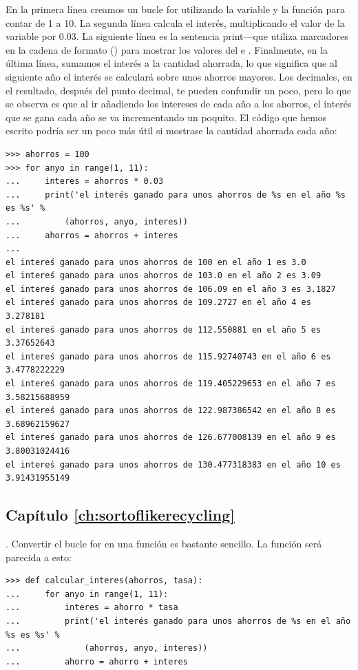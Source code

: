 En la primera línea creamos un bucle for utilizando la variable  y la función  para contar de 1 a 10.   La segunda línea calcula el interés, multiplicando el valor de la variable  por 0.03.  La siguiente línea es la sentencia print---que utiliza marcadores en la cadena de formato () para mostrar los valores del  e .  Finalmente, en la última línea, sumamos el interés a la cantidad ahorrada, lo que significa que al siguiente año el interés se calculará sobre unos ahorros mayores.
Los decimales, en el resultado, después del punto decimal, te pueden confundir un poco, pero lo que se observa es que al ir añadiendo los intereses de cada año a los ahorros, el interés que se gana cada año se va incrementando un poquito.
El código que hemos escrito podría ser un poco más útil si mostrase la cantidad ahorrada cada año:

\begin{listing}
\begin{verbatim}
>>> ahorros = 100
>>> for anyo in range(1, 11):
...     interes = ahorros * 0.03
...     print('el interés ganado para unos ahorros de %s en el año %s es %s' % 
...         (ahorros, anyo, interes))
...     ahorros = ahorros + interes
... 
el intereś ganado para unos ahorros de 100 en el año 1 es 3.0
el intereś ganado para unos ahorros de 103.0 en el año 2 es 3.09
el intereś ganado para unos ahorros de 106.09 en el año 3 es 3.1827
el intereś ganado para unos ahorros de 109.2727 en el año 4 es 3.278181
el intereś ganado para unos ahorros de 112.550881 en el año 5 es 3.37652643
el intereś ganado para unos ahorros de 115.92740743 en el año 6 es 3.4778222229
el intereś ganado para unos ahorros de 119.405229653 en el año 7 es 3.58215688959
el intereś ganado para unos ahorros de 122.987386542 en el año 8 es 3.68962159627
el intereś ganado para unos ahorros de 126.677008139 en el año 9 es 3.80031024416
el intereś ganado para unos ahorros de 130.477318383 en el año 10 es 3.91431955149
\end{verbatim}
\end{listing}

\subsection*{Capítulo \ref{ch:sortoflikerecycling}}

. Convertir el bucle for en una función es bastante sencillo.   La función será parecida a esto:

\begin{listing}
\begin{verbatim}
>>> def calcular_interes(ahorros, tasa):
...     for anyo in range(1, 11):
...         interes = ahorro * tasa
...         print('el interés ganado para unos ahorros de %s en el año %s es %s' % 
...             (ahorros, anyo, interes))
...         ahorro = ahorro + interes
\end{verbatim}
\end{listing}

